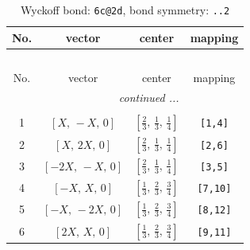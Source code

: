\documentclass[fleqn,8pt]{jsarticle}
\begin{document}
\renewcommand{\arraystretch}{1.2}
\begin{longtable}{cccc}
\caption{Wyckoff bond: {\tt 6c@2d}, bond symmetry: {\tt ..2}}
 \\
 \hline \hline
No. & vector & center & mapping \\ \hline \endfirsthead

\multicolumn{3}{l}{\tablename\ \thetable{}} \\
 \hline \hline
No. & vector & center & mapping \\ \hline \endhead

 \hline \hline
\multicolumn{3}{r}{\footnotesize\it continued ...} \\ \endfoot

 \hline \hline
\multicolumn{3}{r}{} \\ \endlastfoot

1 & $\left[ X,\, - X,\, 0 \right]$ & $\left[ \frac{2}{3},\, \frac{1}{3},\, \frac{1}{4} \right]$ & {\tt [1,4]} \\ \hline
2 & $\left[ X,\, 2 X,\, 0 \right]$ & $\left[ \frac{2}{3},\, \frac{1}{3},\, \frac{1}{4} \right]$ & {\tt [2,6]} \\ \hline
3 & $\left[ - 2 X,\, - X,\, 0 \right]$ & $\left[ \frac{2}{3},\, \frac{1}{3},\, \frac{1}{4} \right]$ & {\tt [3,5]} \\ \hline
4 & $\left[ - X,\, X,\, 0 \right]$ & $\left[ \frac{1}{3},\, \frac{2}{3},\, \frac{3}{4} \right]$ & {\tt [7,10]} \\ \hline
5 & $\left[ - X,\, - 2 X,\, 0 \right]$ & $\left[ \frac{1}{3},\, \frac{2}{3},\, \frac{3}{4} \right]$ & {\tt [8,12]} \\ \hline
6 & $\left[ 2 X,\, X,\, 0 \right]$ & $\left[ \frac{1}{3},\, \frac{2}{3},\, \frac{3}{4} \right]$ & {\tt [9,11]} \\
\end{longtable}
\renewcommand{\arraystretch}{1.2}
\end{document}
